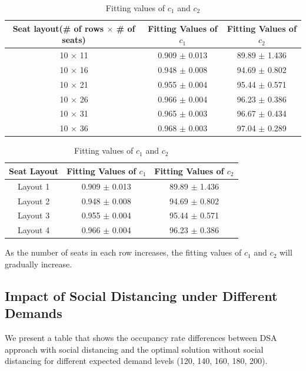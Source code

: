 \begin{table}[ht]
  \centering
  \caption{Fitting values of $c_1$ and $c_2$}
  \begin{tabular}{|c|c|c|}
  \hline
   Seat layout(\# of rows $\times$ \# of seats) & Fitting Values of $c_1$ & Fitting Values of $c_2$  \\
  \hline
   10 $\times$ 11 & 0.909 $\pm$ 0.013  & 89.89 $\pm$ 1.436 \\
   10 $\times$ 16 & 0.948 $\pm$ 0.008  & 94.69 $\pm$ 0.802 \\
   10 $\times$ 21 & 0.955 $\pm$ 0.004 & 95.44 $\pm$ 0.571 \\
   10 $\times$ 26 & 0.966 $\pm$ 0.004 & 96.23 $\pm$ 0.386 \\
   10 $\times$ 31 & 0.965 $\pm$ 0.003 & 96.67 $\pm$ 0.434 \\
   10 $\times$ 36 & 0.968 $\pm$ 0.003 & 97.04 $\pm$ 0.289 \\
   \hline
  \end{tabular}
\end{table}


\begin{table}[ht]
  \centering
  \caption{Fitting values of $c_1$ and $c_2$}
  \begin{tabular}{|c|c|c|}
  \hline
   Seat Layout & Fitting Values of $c_1$ & Fitting Values of $c_2$  \\
  \hline
   Layout 1 & 0.909 $\pm$ 0.013  & 89.89 $\pm$ 1.436 \\
   Layout 2 & 0.948 $\pm$ 0.008  & 94.69 $\pm$ 0.802 \\
   Layout 3 & 0.955 $\pm$ 0.004 & 95.44 $\pm$ 0.571 \\
   Layout 4 & 0.966 $\pm$ 0.004 & 96.23 $\pm$ 0.386 \\
   \hline
  \end{tabular}
\end{table}

As the number of seats in each row increases, the fitting values of $c_1$ and $c_2$ will gradually increase.

\subsection{Impact of Social Distancing under Different Demands}
We present a table that shows the occupancy rate differences between DSA approach with social distancing and the optimal solution without social distancing for different expected demand levels (120, 140, 160, 180, 200).

